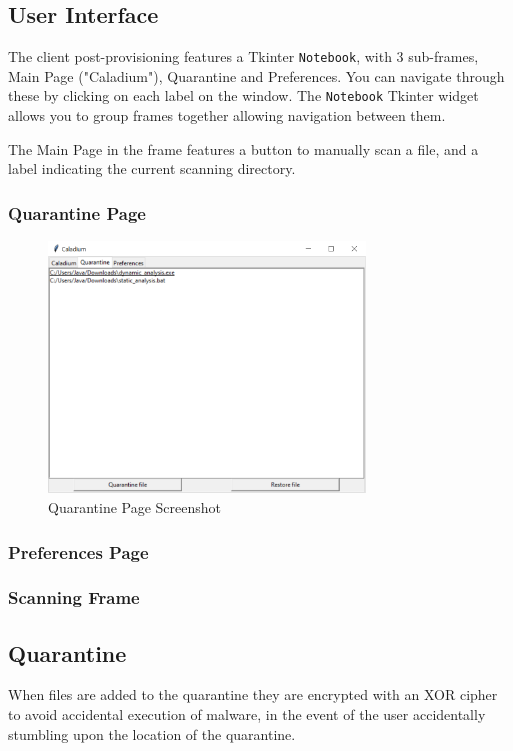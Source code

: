 \subsection{User Interface}
The client post-provisioning features a Tkinter \texttt{Notebook},
with 3 sub-frames, Main Page ("Caladium"), Quarantine and Preferences.
You can navigate through these by clicking on each label on the window.
The \texttt{Notebook} Tkinter widget allows you to
group frames together allowing navigation between them.

The Main Page in the frame features a button to manually scan a file,
and a label indicating the current scanning directory.


\subsubsection{Quarantine Page}

\begin{figure}[h!]
    \centering
    \includegraphics[width=0.75\textwidth]{../docs/client.png}
    \caption{Quarantine Page Screenshot}
    \label{image:quarantinePageScreenshot}
\end{figure}

\subsubsection{Preferences Page}

\subsubsection{Scanning Frame}

\subsection{Quarantine}
When files are added to the quarantine they are encrypted with an XOR cipher to avoid accidental execution of malware, in the event of the user accidentally stumbling upon the location of the quarantine.

